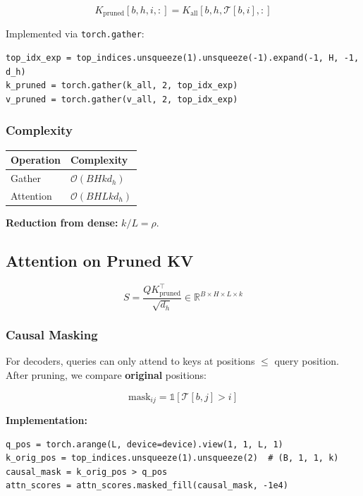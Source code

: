 \[
K_\text{pruned}[b, h, i, :] = K_\text{all}[b, h, \mathcal{T}[b, i], :]
\tag{4.3}
\]

Implemented via \texttt{torch.gather}:

\begin{lstlisting}
top_idx_exp = top_indices.unsqueeze(1).unsqueeze(-1).expand(-1, H, -1, d_h)
k_pruned = torch.gather(k_all, 2, top_idx_exp)
v_pruned = torch.gather(v_all, 2, top_idx_exp)
\end{lstlisting}

\subsubsection{Complexity}

\begin{table}[H]
\centering
\small
\begin{tabular}{ll}
\toprule
\textbf{Operation} & \textbf{Complexity} \\
\midrule
Gather & $\mathcal{O}(B H k d_h)$ \\
Attention & $\mathcal{O}(B H L k d_h)$ \\
\bottomrule
\end{tabular}
\end{table}

\textbf{Reduction from dense:} $k / L = \rho$.

\subsection{Attention on Pruned KV}

\[
S = \frac{Q K_\text{pruned}^\top}{\sqrt{d_h}} \in \mathbb{R}^{B \times H \times L \times k}
\tag{4.4}
\]

\subsubsection{Causal Masking}

For decoders, queries can only attend to keys at positions $\leq$ query 
position. After pruning, we compare \textbf{original} positions:

\[
\text{mask}_{ij} = \mathbb{1}[\mathcal{T}[b, j] > i]
\tag{4.5}
\]

\textbf{Implementation:}

\begin{lstlisting}
q_pos = torch.arange(L, device=device).view(1, 1, L, 1)
k_orig_pos = top_indices.unsqueeze(1).unsqueeze(2)  # (B, 1, 1, k)
causal_mask = k_orig_pos > q_pos
attn_scores = attn_scores.masked_fill(causal_mask, -1e4)
\end{lstlisting}

